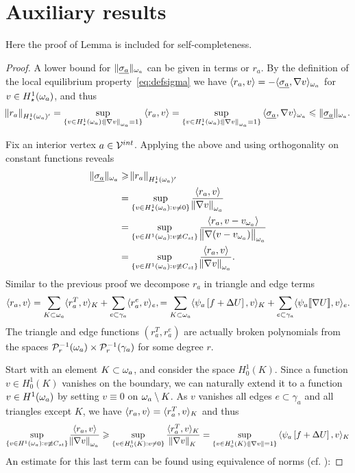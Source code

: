 \documentclass[thesis.tex]{subfiles}
\begin{document}
\section{Auxiliary results}
\label{sec:aux}
Here the proof of Lemma \label{lem:clasequivlow} is included for self-completeness.
\begin{proof}
  A lower bound for $\| \underline{\sigma_a} \|_{\omega_a}$ can be given in terms or $r_a$.
  By the definition of the local equilibrium property~\eqref{eq:defsigma} we have $\langle r_a, v \rangle = - \langle \underline{\sigma_a}, \nabla v \rangle_{\omega_a}$ for $v \in H_\star^1(\omega_a)$,
  and thus
  \[
    \norm{r_a}_{H_\star^1(\omega_a)'} = \sup_{\{v \in H_\star^1(\omega_a) : \norm{\nabla v}_{\omega_a} = 1\}} {\langle r_a, v \rangle} = \sup_{\{v \in H_\star^1(\omega_a) : \norm{\nabla v}_{\omega_a}=1\}} {\langle \underline{\sigma_a}, \nabla v \rangle_{\omega_a}} \leqslant \| \underline{\sigma_a} \|_{\omega_a}.
  \]

  Fix an interior vertex  $a \in \mathcal{V}^{int}$. Applying the above and using orthogonality on constant functions reveals  
  \begin{align*}
    \| \underline{\sigma_a} \|_{\omega_a} &\geqslant \norm{r_a}_{H^1_\star(\omega_a)'} \\
    &= \sup_{\{v \in H^1_\star(\omega_a) : v \ne 0\}} { \langle r_a, v \rangle \over \norm{\nabla v}_{\omega_a}} \\
    &= \sup_{\{v \in H^1(\omega_a) : v \not \equiv C_{st}\}} { \langle r_a, v - v_{\omega_a} \rangle \over \norm{\nabla (v - v_{\omega_a})}_{\omega_a}} \\
    &= \sup_{\{v \in H^1(\omega_a) : v \not \equiv C_{st}\}} { \langle r_a, v \rangle \over \norm{\nabla v}_{\omega_a}}.
  \end{align*}
  Similar to the previous proof we decompose $r_a$ in triangle and edge terms
  \[
    \langle r_a,v \rangle = \sum_{K\subset \omega_a} \langle{r^T_a, v}\rangle_K + \sum_{e \subset \gamma_a} \langle r^e_a, v \rangle_e,
    = \sum_{K\subset \omega_a} \langle{\psi_a \left [f+\Delta U \right], v}\rangle_K + \sum_{e \subset \gamma_a} \langle \psi_a \llbracket \nabla U \rrbracket, v \rangle_e.
  \]
  The triangle and edge functions $(r^T_a, r^e_a)$ are actually broken polynomials from the spaces $\mathcal{P}_r^{-1}(\omega_a)\times \mathcal{P}_r^{-1}(\gamma_a)$ for some degree $r$.

  Start with an element $K \subset \omega_a$, and consider the space $H_0^1(K)$. Since a function $v \in H_0^1(K)$ vanishes on the boundary, 
  we can naturally extend it to a function $v \in H^1(\omega_a)$ by setting $v \equiv 0$ on $\omega_a \setminus K$. As $v$
  vanishes all edges $e \subset \gamma_a$ and all triangles except $K$, we have $\langle r_a, v \rangle = \langle{r_a^T, v}\rangle_K$ and thus
  \[
    \sup_{\{v \in H^1(\omega_a) : v \not \equiv C_{st}\}} { \langle r_a, v \rangle \over \norm{\nabla v}_{\omega_a}} 
    \geqslant \sup_{\{v \in H_0^1(K) : v \ne 0\}} { \langle{r^T_a, v}\rangle_K \over \norm{\nabla v}_{K}}
    = \sup_{\{v \in H_0^1(K) :  \norm{\nabla v}=1\}} { \langle\psi_a\left[ f + \Delta U\right],v\rangle_K }
  \]
  An estimate for this last term can be found using equivalence of norms (cf. \cite[Ex~9.x.5]{brenner}):
  

\end{proof}
\end{document}
